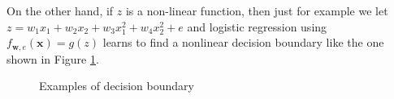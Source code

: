 \documentclass[12pt, twoside]{article}
\begin{document}
\begin{multicols*}{2}
		On the other hand, if $z$ is a non-linear function, then just for example we let $z=w_1x_1+w_2x_2+w_3x_1^2+w_4x_2^2+e$ and logistic regression using $f_{\mathbf{w},e}(\mathbf{x})=g(z)$ learns to find a nonlinear decision boundary like the one shown in Figure \ref{fig:decision}.
		\begin{figure}[H]
			\centering
			\caption{Examples of decision boundary}
			\label{fig:decision}
		\end{figure}
		

\end{multicols*}
\end{document}
